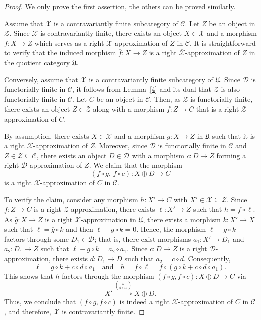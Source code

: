 \documentclass[10pt,a4paper]{amsart}
\def \text{\mbox}
\def\C{\mathcal{C}}
\def\D{\mathcal{D}}
\def\X{\mathcal{X}}
\def\Z{\mathcal {Z}}
\begin{document}
\begin{proof}
We only prove the first assertion, the others can be proved similarly.

Assume that $\X$ is a contravariantly finite subcategory of $\C$. Let $Z$ be an object in $\Z$. Since $\X$ is contravariantly finite, there exists an object $X \in \X$ and a morphism $f \colon X \to Z$ which serves as a right $\X$-approximation of $Z$ in $\C$. It is straightforward to verify that the induced morphism $\overline{f} \colon X \to Z$ is a right $\overline{\X}$-approximation of $Z$ in the quotient category $\mathfrak{U}$.

Conversely, assume that $\overline{\X}$ is a contravariantly finite subcategory of $\mathfrak{U}$. Since $\D$ is functorially finite in $\C$, it follows from Lemma~\ref{4} and its dual that $\Z$ is also functorially finite in $\C$. Let $C$ be an object in $\C$. Then, as $\Z$ is functorially finite, there exists an object $Z \in \Z$ along with a morphism $f \colon Z \to C$ that is a right $\Z$-approximation of $C$.

By assumption, there exists $X \in \X$ and a morphism $\overline{g} \colon X \to Z$ in $\mathfrak{U}$ such that it is a right $\overline{\X}$-approximation of $Z$. Moreover, since $\D$ is functorially finite in $\C$ and $Z \in \Z \subseteq \C$, there exists an object $D \in \D$ with a morphism $c \colon D \to Z$ forming a right $\D$-approximation of $Z$. We claim that the morphism
\[
(f \circ g,\, f \circ c) \colon X \oplus D \to C
\]
is a right $\X$-approximation of $C$ in $\C$.

To verify the claim, consider any morphism $h \colon X' \to C$ with $X' \in \X \subseteq \Z$. Since $f \colon Z \to C$ is a right $\Z$-approximation, there exists $\ell \colon X' \to Z$ such that $h = f \circ \ell$. As $\overline{g} \colon X \to Z$ is a right $\overline{\X}$-approximation in $\mathfrak{U}$, there exists a morphism $\overline{k} \colon X' \to X$ such that $\overline{\ell} = \overline{g} \circ \overline{k}$ and then
$
\overline{\ell - g \circ k} = \overline{0}.
$
Hence, the morphism $\ell - g \circ k$ factors through some $D_1 \in \D$; that is, there exist morphisms $a_1 \colon X' \to D_1$ and $a_2 \colon D_1 \to Z$ such that $\ell - g \circ k = a_2 \circ a_1$. Since $c \colon D \to Z$ is a right $\D$-approximation, there exists $d \colon D_1 \to D$ such that $a_2 = c \circ d$. Consequently,
\[
\ell = g \circ k + c \circ d \circ a_1 \quad \text{and} \quad h = f \circ \ell = f \circ (g \circ k + c \circ d \circ a_1).
\]
This shows that $h$ factors through the morphism $(f \circ g, f \circ c) \colon X \oplus D \to C$ via
\[
X' \xrightarrow{\binom{k}{d \circ a_1}} X \oplus D.
\]
Thus, we conclude that $(f \circ g, f \circ c)$ is indeed a right $\X$-approximation of $C$ in $\C$, and therefore, $\X$ is contravariantly finite.
\end{proof}
\end{document}
